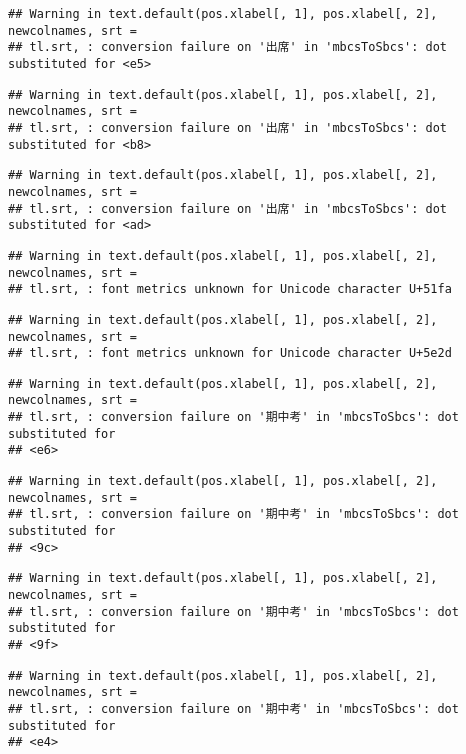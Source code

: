 \documentclass[
]{book}
\begin{document}
\begin{verbatim}
## Warning in text.default(pos.xlabel[, 1], pos.xlabel[, 2], newcolnames, srt =
## tl.srt, : conversion failure on '出席' in 'mbcsToSbcs': dot substituted for <e5>
\end{verbatim}

\begin{verbatim}
## Warning in text.default(pos.xlabel[, 1], pos.xlabel[, 2], newcolnames, srt =
## tl.srt, : conversion failure on '出席' in 'mbcsToSbcs': dot substituted for <b8>
\end{verbatim}

\begin{verbatim}
## Warning in text.default(pos.xlabel[, 1], pos.xlabel[, 2], newcolnames, srt =
## tl.srt, : conversion failure on '出席' in 'mbcsToSbcs': dot substituted for <ad>
\end{verbatim}

\begin{verbatim}
## Warning in text.default(pos.xlabel[, 1], pos.xlabel[, 2], newcolnames, srt =
## tl.srt, : font metrics unknown for Unicode character U+51fa
\end{verbatim}

\begin{verbatim}
## Warning in text.default(pos.xlabel[, 1], pos.xlabel[, 2], newcolnames, srt =
## tl.srt, : font metrics unknown for Unicode character U+5e2d
\end{verbatim}

\begin{verbatim}
## Warning in text.default(pos.xlabel[, 1], pos.xlabel[, 2], newcolnames, srt =
## tl.srt, : conversion failure on '期中考' in 'mbcsToSbcs': dot substituted for
## <e6>
\end{verbatim}

\begin{verbatim}
## Warning in text.default(pos.xlabel[, 1], pos.xlabel[, 2], newcolnames, srt =
## tl.srt, : conversion failure on '期中考' in 'mbcsToSbcs': dot substituted for
## <9c>
\end{verbatim}

\begin{verbatim}
## Warning in text.default(pos.xlabel[, 1], pos.xlabel[, 2], newcolnames, srt =
## tl.srt, : conversion failure on '期中考' in 'mbcsToSbcs': dot substituted for
## <9f>
\end{verbatim}

\begin{verbatim}
## Warning in text.default(pos.xlabel[, 1], pos.xlabel[, 2], newcolnames, srt =
## tl.srt, : conversion failure on '期中考' in 'mbcsToSbcs': dot substituted for
## <e4>
\end{verbatim}
\end{document}

